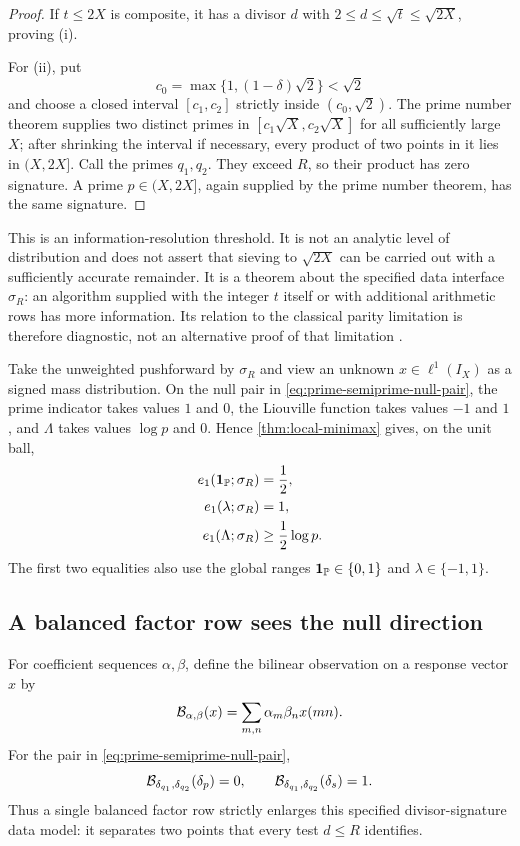 \begin{proof}
If $t\leq2X$ is composite, it has a divisor $d$ with
$2\leq d\leq\sqrt t\leq\sqrt{2X}$, proving (i).

For (ii), put
\[
 c_0=\max\{1,(1-\delta)\sqrt2\}<\sqrt2
\]
and choose a closed interval $[c_1,c_2]$ strictly inside
$(c_0,\sqrt2)$.  The prime number theorem supplies two distinct primes in
$[c_1\sqrt X,c_2\sqrt X]$ for all sufficiently large $X$; after shrinking
the interval if necessary, every product of two points in it lies in
$(X,2X]$.  Call the primes $q_1,q_2$.  They exceed $R$, so their product
has zero signature.  A prime $p\in(X,2X]$, again supplied by the prime
number theorem, has the same signature.
\end{proof}

This is an information-resolution threshold.  It is not an analytic level
of distribution and does not assert that sieving to $\sqrt{2X}$ can be
carried out with a sufficiently accurate remainder.  It is a theorem about
the specified data interface $\sigma_R$: an algorithm supplied with the
integer $t$ itself or with additional arithmetic rows has more information.
Its relation to the classical parity limitation is therefore diagnostic,
not an alternative proof of that limitation \citep{Selberg1952Parity}.

Take the unweighted pushforward by $\sigma_R$ and view an unknown
$x\in\ell^1(I_X)$ as a signed mass distribution.  On the null pair in
\eqref{eq:prime-semiprime-null-pair}, the prime indicator takes values
$1$ and $0$, the Liouville function takes values $-1$ and $1$, and
$\Lambda$ takes values $\log p$ and $0$.  Hence
\cref{thm:local-minimax} gives, on the unit ball,
\begin{align}
 e_1(\mathbf 1_{\mathbb P};\sigma_R)&=\frac12,
 \label{eq:prime-indicator-minimax}\\
 e_1(\lambda;\sigma_R)&=1,
 \label{eq:liouville-minimax}\\
 e_1(\Lambda;\sigma_R)&\geq\frac12\log p.
 \label{eq:lambda-minimax}
\end{align}
The first two equalities also use the global ranges
$\mathbf 1_{\mathbb P}\in\{0,1\}$ and $\lambda\in\{-1,1\}$.

\subsection{A balanced factor row sees the null direction}

For coefficient sequences $\alpha,\beta$, define the bilinear observation
on a response vector $x$ by
\begin{equation}
 \mathcal B_{\alpha,\beta}(x)
 =\sum_{m,n}\alpha_m\beta_n x(mn).
 \label{eq:typeii-row}
\end{equation}
For the pair in \eqref{eq:prime-semiprime-null-pair},
\begin{equation}
 \mathcal B_{\delta_{q_1},\delta_{q_2}}(\delta_p)=0,
 \qquad
 \mathcal B_{\delta_{q_1},\delta_{q_2}}(\delta_s)=1.
 \label{eq:typeii-separates-null-pair}
\end{equation}
Thus a single balanced factor row strictly enlarges this specified
divisor-signature data model: it separates two points that every test
$d\leq R$ identifies.


